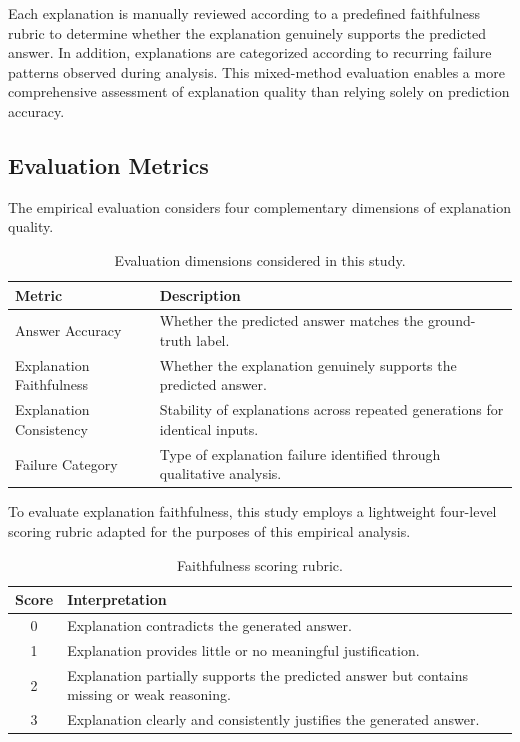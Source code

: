 \documentclass{article}
\begin{document}
Each explanation is manually reviewed according to a predefined faithfulness rubric to determine whether the explanation genuinely supports the predicted answer. In addition, explanations are categorized according to recurring failure patterns observed during analysis. This mixed-method evaluation enables a more comprehensive assessment of explanation quality than relying solely on prediction accuracy.

\subsection{Evaluation Metrics}

The empirical evaluation considers four complementary dimensions of explanation quality.

\begin{table}[h]
\centering
\caption{Evaluation dimensions considered in this study.}
\begin{tabular}{lp{8cm}}
\hline
Metric & Description\\
\hline
Answer Accuracy & Whether the predicted answer matches the ground-truth label.\\

Explanation Faithfulness & Whether the explanation genuinely supports the predicted answer.\\

Explanation Consistency & Stability of explanations across repeated generations for identical inputs.\\

Failure Category & Type of explanation failure identified through qualitative analysis.\\
\hline
\end{tabular}
\label{tab:metrics}
\end{table}

To evaluate explanation faithfulness, this study employs a lightweight four-level scoring rubric adapted for the purposes of this empirical analysis.

\begin{table}[h]
\centering
\caption{Faithfulness scoring rubric.}
\begin{tabular}{cl}
\hline
Score & Interpretation\\
\hline
0 & Explanation contradicts the generated answer.\\

1 & Explanation provides little or no meaningful justification.\\

2 & Explanation partially supports the predicted answer but contains missing or weak reasoning.\\

3 & Explanation clearly and consistently justifies the generated answer.\\
\hline
\end{tabular}
\label{tab:faithfulness}
\end{table}
\end{document}
